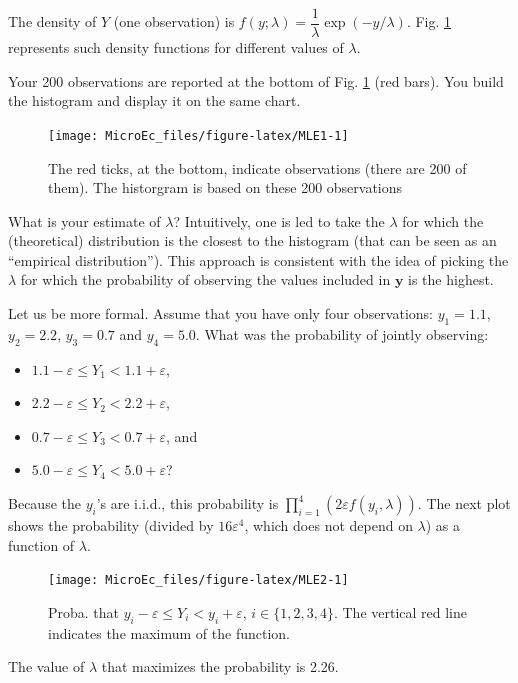 \documentclass[
  12pt,
]{book}
\providecommand{\tightlist}{%
  \setlength{\itemsep}{0pt}\setlength{\parskip}{0pt}}
\theoremstyle{definition}
\theoremstyle{definition}
\theoremstyle{definition}
\theoremstyle{definition}
\theoremstyle{remark}
\begin{document}
The density of \(Y\) (one observation) is \(f(y;\lambda) = \dfrac{1}{\lambda}\exp(-y/\lambda)\). Fig. \ref{fig:MLE1} represents such density functions for different values of \(\lambda\).

Your 200 observations are reported at the bottom of Fig. \ref{fig:MLE1} (red bars). You build the histogram and display it on the same chart.

\begin{figure}
\texttt{[image: MicroEc\_files/figure-latex/MLE1-1]} \caption{The red ticks, at the bottom, indicate observations (there are 200 of them). The historgram is based on these 200 observations}\label{fig:MLE1}
\end{figure}

What is your estimate of \(\lambda\)? Intuitively, one is led to take the \(\lambda\) for which the (theoretical) distribution is the closest to the histogram (that can be seen as an ``empirical distribution''). This approach is consistent with the idea of picking the \(\lambda\) for which the probability of observing the values included in \(\mathbf{y}\) is the highest.

Let us be more formal. Assume that you have only four observations: \(y_1=1.1\), \(y_2=2.2\), \(y_3=0.7\) and \(y_4=5.0\). What was the probability of jointly observing:

\begin{itemize}
\tightlist
\item
  \(1.1-\varepsilon \le Y_1 < 1.1+\varepsilon\),
\item
  \(2.2-\varepsilon \le Y_2 < 2.2+\varepsilon\),
\item
  \(0.7-\varepsilon \le Y_3 < 0.7+\varepsilon\), and
\item
  \(5.0-\varepsilon \le Y_4 < 5.0+\varepsilon\)?
\end{itemize}

Because the \(y_i\)'s are i.i.d., this probability is \(\prod_{i=1}^4(2\varepsilon f(y_i,\lambda))\).
The next plot shows the probability (divided by \(16\varepsilon^4\), which does not depend on \(\lambda\)) as a function of \(\lambda\).

\begin{figure}
\texttt{[image: MicroEc\_files/figure-latex/MLE2-1]} \caption{Proba. that $y_i-\varepsilon \le Y_i < y_i+\varepsilon$, $i \in \{1,2,3,4\}$. The vertical red line indicates the maximum of the function.}\label{fig:MLE2}
\end{figure}

The value of \(\lambda\) that maximizes the probability is 2.26.
\end{document}
